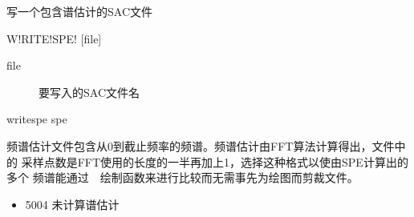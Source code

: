 \label{spe:writespe}

写一个包含谱估计的SAC文件

\begin{SACSTX}
W!RITE!SPE! [file]
\end{SACSTX}

\begin{description}
\item [file] 要写入的SAC文件名
\end{description}

\begin{SACDFT}
writespe spe
\end{SACDFT}

频谱估计文件包含从0到截止频率的频谱。频谱估计由FFT算法计算得出，文件中的
采样点数是FFT使用的长度的一半再加上1，选择这种格式以使由SPE计算出的多个
频谱能通过~~绘制函数来进行比较而无需事先为绘图而剪裁文件。

\begin{itemize}
\item 5004 未计算谱估计
\end{itemize}
